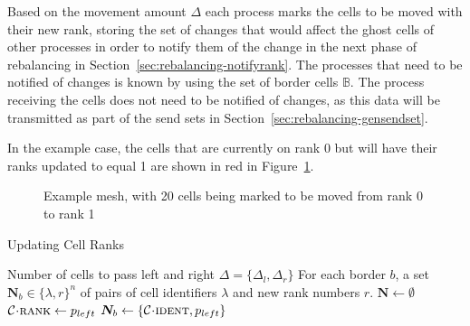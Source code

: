 \documentclass[twoside]{IIBproject}
\newcommand{\vect} [1] {\bm{#1}}
\newcommand{\acc}{{\mkern 0.5mu\cdot\mkern 0.5mu}}
\numberwithin{figure}{section}
\begin{document}
            Based on the movement amount $\Delta$ each process marks the cells to be moved with their new rank, storing the set of changes that would affect the ghost cells of other processes in order to notify them of the change in the next phase of rebalancing in Section~\ref{sec:rebalancing-notifyrank}. The processes that need to be notified of changes is known by using the set of border cells $\mathbb{B}$. The process receiving the cells does not need to be notified of changes, as this data will be transmitted as part of the send sets in Section~\ref{sec:rebalancing-gensendset}.

            In the example case, the cells that are currently on rank 0 but will have their ranks updated to equal 1 are shown in red in Figure~\ref{fig:rebalance-ranks}.

            \begin{figure}[!htbp]
                
                \caption{Example mesh, with 20 cells being marked to be moved from rank 0 to rank 1}
                \label{fig:rebalance-ranks}
            \end{figure}

            \begin{algorithm}[!htbp]
                \caption{Updating Cell Ranks}
                \label{alg:rebalance-updateranks}

                \begin{algorithmic}
                    \Require Number of cells to pass left and right $\Delta = \{\Delta_l,\Delta_r\}$
                    \Ensure For each border $b$, a set $\vect{N}_b \in \{\lambda,r\}^n$ of pairs of cell identifiers $\lambda$ and new rank numbers $r$.
                    \Statex
                    \State $\vect{N} \gets \emptyset$
                        \State $\mathcal{C} \acc \textproc{rank} \gets p_{left}$
                                \State $\vect{N}_b \gets \{\mathcal{C} \acc \textproc{ident} , p_{left}\}$
                            \EndIf
                        \EndFor
                    \EndFor
                \end{algorithmic}
            \end{algorithm}
\end{document}
